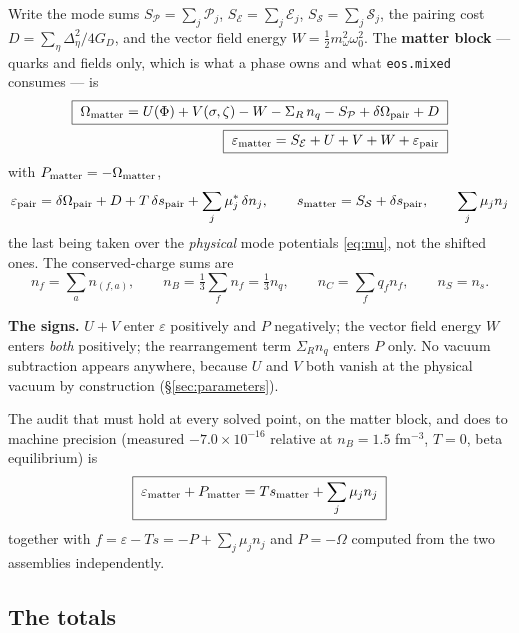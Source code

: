 \documentclass[11pt,a4paper]{article}
\newcommand{\mustar}{\mu^{*}}
\newcommand{\code}[1]{\texttt{#1}}
\begin{document}
Write the mode sums
$S_{\mathcal P}=\sum_j\mathcal P_j$, $S_{\mathcal E}=\sum_j\mathcal E_j$,
$S_{\mathcal S}=\sum_j\mathcal S_j$, the pairing cost
$D=\sum_\eta\Delta_\eta^2/4G_D$, and the vector field energy
$W=\tfrac12 m_\omega^2\omega_0^2$. The \textbf{matter block} --- quarks and
fields only, which is what a phase owns and what \code{eos.mixed} consumes ---
is
\begin{align}
\boxed{\;\Omega_{\rm matter} = U(\Phi) + V(\sigma,\zeta) - W - \Sigma_R\,n_q
 - S_{\mathcal P} + \delta\Omega_{\rm pair} + D\;}
\label{eq:Omega}\\
\boxed{\;\varepsilon_{\rm matter} = S_{\mathcal E} + U + V + W
 + \varepsilon_{\rm pair}\;}
\label{eq:eps}
\end{align}
with $P_{\rm matter}=-\Omega_{\rm matter}$,
\begin{equation}
\varepsilon_{\rm pair} = \delta\Omega_{\rm pair} + D
 + T\,\delta s_{\rm pair} + \sum_j \mustar_j\,\delta n_j,
\qquad
s_{\rm matter} = S_{\mathcal S} + \delta s_{\rm pair},
\qquad
\sum_j\mu_jn_j
\end{equation}
the last being taken over the \emph{physical} mode potentials \eqref{eq:mu},
not the shifted ones. The conserved-charge sums are
\begin{equation}
n_f = \sum_a n_{(f,a)},\qquad
n_B = \tfrac13\sum_f n_f = \tfrac13 n_q,\qquad
n_C = \sum_f q_f n_f,\qquad
n_S = n_s .
\label{eq:sums}
\end{equation}

\textbf{The signs.} $U+V$ enter $\varepsilon$ positively and $P$ negatively;
the vector field energy $W$ enters \emph{both} positively; the rearrangement
term $\Sigma_R n_q$ enters $P$ only. No vacuum subtraction appears anywhere,
because $U$ and $V$ both vanish at the physical vacuum by construction
(\S\ref{sec:parameters}).

The audit that must hold at every solved point, on the matter block, and does
to machine precision (measured $-7.0\times10^{-16}$ relative at
$n_B=1.5$ fm$^{-3}$, $T=0$, beta equilibrium) is
\begin{equation}
\boxed{\;\varepsilon_{\rm matter} + P_{\rm matter}
 = T s_{\rm matter} + \sum_j \mu_j n_j\;}
\label{eq:euler}
\end{equation}
together with $f=\varepsilon-Ts=-P+\sum_j\mu_jn_j$ and
$P=-\Omega$ computed from the two assemblies independently.

\subsection{The totals}
\label{sec:totals}
\end{document}
